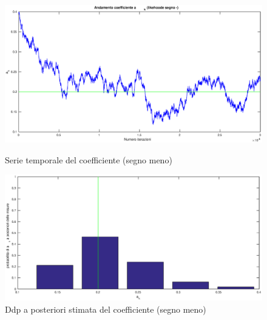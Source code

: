 \begin{figure}[ht]
\centering
\begin{minipage}[b]{0.45\linewidth}
\includegraphics[scale=0.15]{akhminus.eps}
\caption{Serie temporale del coefficiente (segno meno)}
\label{fig:minipage1}
\end{minipage}
\quad
\begin{minipage}[b]{0.45\linewidth}
\includegraphics[scale=0.15]{p_ak_minus.eps}
\caption{Ddp a posteriori stimata del coefficiente (segno meno)}
\label{fig:minipage2}
\end{minipage}
\end{figure}

